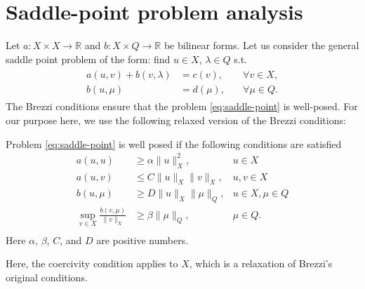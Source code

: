 \section{Saddle-point problem analysis}
Let $a: X \times X \rightarrow \mathbb{R}$ and $b: X\times Q \rightarrow \mathbb{R}$ be bilinear forms. Let us consider the general saddle point problem of the form: find $u\in X$, $\lambda\in Q$ s.t.
\begin{eqnarray}\label{eq:saddle-point}
\begin{aligned}
a(u,v)+b(v,\lambda)&=c(v),\quad &\forall v\in X,\\
b(u,\mu)&=d(\mu), \quad &\forall \mu\in Q.
\end{aligned}
\end{eqnarray}
The Brezzi conditions \cite{MR365287} ensure that the problem \eqref{eq:saddle-point} is well-posed.
For our purpose here, we use the following relaxed version of the Brezzi conditions:  
\begin{theorem}{}\label{th:bnb}
Problem \eqref{eq:saddle-point} is well posed if the following conditions are satisfied
\begin{align}\label{BNB1}
a(u,u) &\ge \alpha \|u\|^2_{X}, & u\in X\\
\label{BNB2}
a(u,v) &\le C \|u\|_{X}\|v\|_{X}, & u,v \in X\\
\label{BNB3}
b(u,\mu) &\ge D \|u\|_{X} \|\mu\|_{Q}, & u\in X, \mu\in Q\\
\label{BNB4}
\sup_{v\in X} \frac{b(v,\mu)}{\|v\|_{X}} &\geq \beta\|\mu\|_{Q}, & \mu \in Q .\\
\end{align}
Here $\alpha$, $\beta$, $C$, and $D$ are positive numbers. 
\end{theorem} 
Here, the coercivity condition applies to $X$, which is a relaxation of Brezzi's original conditions.  


